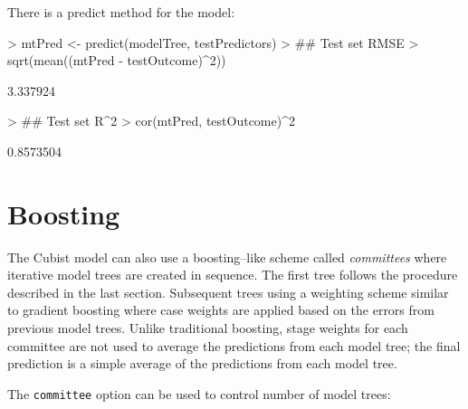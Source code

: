 \documentclass[12pt]{article}
\newcommand{\code}[1]{\mbox{\footnotesize\color{darkblue}\texttt{#1}}}
\renewenvironment{Schunk}{\vspace{\topsep}}{\vspace{\topsep}}
\begin{document}
There is a predict method for the model:
\begin{Schunk}
\begin{Sinput}
> mtPred <- predict(modelTree, testPredictors)
> ## Test set RMSE
> sqrt(mean((mtPred - testOutcome)^2))
\end{Sinput}
\begin{Soutput}
[1] 3.337924
\end{Soutput}
\begin{Sinput}
> ## Test set R^2
> cor(mtPred, testOutcome)^2
\end{Sinput}
\begin{Soutput}
[1] 0.8573504
\end{Soutput}
\end{Schunk}

\section{Boosting}

The Cubist model can also use a boosting--like scheme called {\em committees} where iterative model trees are created in sequence. The first tree follows the procedure described in the last section. Subsequent trees using a weighting scheme similar to gradient boosting where case weights are applied based on the errors from previous model trees. Unlike traditional boosting, stage weights for each committee are not used to average the predictions from each model tree; the final prediction is a simple average of the predictions from each model tree.

The \code{committee} option can be used to control number of model trees:
\end{document}
